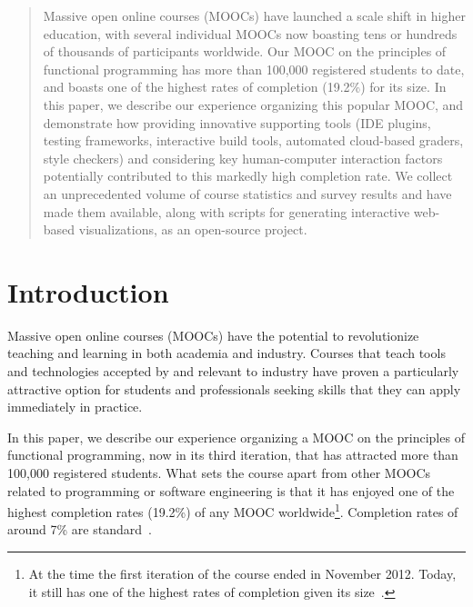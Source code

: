 \documentclass{sig-alternate}
\begin{document}
\maketitle
\begin{abstract}
Massive open online courses (MOOCs) have launched a scale shift in higher education, with several individual MOOCs now boasting tens or hundreds of thousands of participants worldwide. Our MOOC on the principles of functional
programming has more than 100,000 registered students to date, and boasts one of the highest rates of completion (19.2\%) for its size. In this paper, we describe our experience organizing this popular MOOC, and demonstrate how providing innovative supporting tools (IDE plugins, testing frameworks, interactive build tools, automated cloud-based graders, style checkers) and considering key human-computer interaction factors potentially contributed to this markedly high completion rate. We collect an unprecedented volume of course statistics and survey results and have made them available, along with scripts for generating interactive web-based visualizations, as an open-source project.
\end{abstract}




\section{Introduction}

Massive open online courses (MOOCs) have the potential to revolutionize teaching
and learning in both academia and industry.
Courses that teach tools and technologies accepted by and relevant to
industry have proven a particularly attractive option for students and professionals seeking  skills
that they can apply immediately in practice.

In this paper, we describe our experience organizing a MOOC on the principles of functional
programming, now in its third iteration, that has attracted more than 100,000 registered students.
What sets the course apart from other MOOCs related to programming or software engineering is that it has enjoyed one of the highest completion rates (19.2\%) of any MOOC worldwide\footnote{At the time the first iteration of the course ended in November 2012. Today, it still has one of the highest rates of completion given its size~\cite{moocCompletionRates}.}. Completion rates of around 7\% are standard~\cite{Parr13}.
\end{document}
